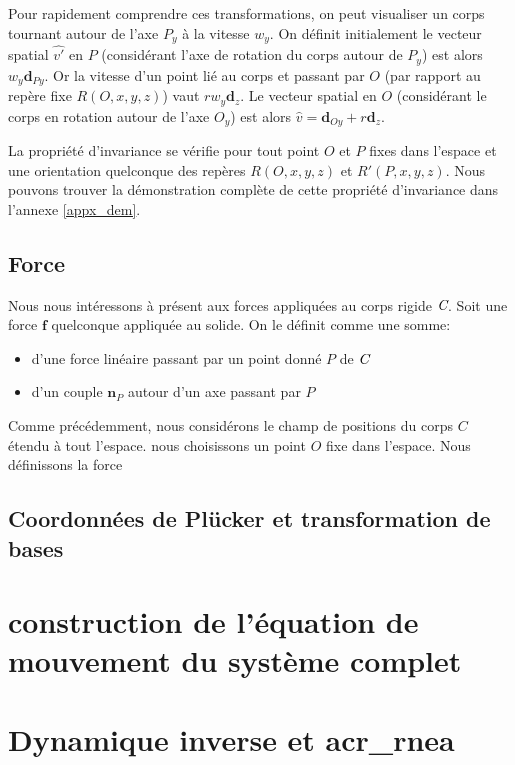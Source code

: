 \documentclass{report}
\begin{document}
Pour rapidement comprendre ces transformations, on peut visualiser un corps tournant autour de l'axe $P_{y}$ à la vitesse $w_{y}$. On définit initialement le vecteur spatial $\widehat{v'}$ en $P$ (\cad considérant l'axe de rotation du corps autour de $P_{y}$) est alors $w_{y}\textbf{d}_{Py}$. Or la vitesse d'un point lié au corps et passant par $O$ (par rapport au repère fixe $R(O,x,y,z)$) vaut $rw_{y}\textbf{d}_{z}$. Le vecteur spatial en $O$ (\cad considérant le corps en rotation autour de l'axe $O_{y}$) est alors $\widehat{v}=\textbf{d}_{Oy}+r\textbf{d}_{z}$.

La propriété d'invariance se vérifie pour tout point $O$ et $P$ fixes dans l'espace et une orientation quelconque des repères $R(O,x,y,z)$ et $R'(P,x,y,z)$. Nous pouvons trouver la démonstration complète de cette propriété d'invariance dans l'annexe \ref{appx_dem}.


\subsection{Force}

Nous nous intéressons à présent aux forces appliquées au corps rigide $\emph{C}$. Soit une force $\textbf{f}$ quelconque appliquée au solide. On le définit comme une somme:
\begin{itemize}
\item d'une force linéaire passant par un point donné $P$ de $\emph{C}$
\item d'un couple $\textbf{n}_{P}$ autour d'un axe passant par $P$
\end{itemize}

Comme précédemment, nous considérons le champ de positions du corps $C$ étendu à tout l'espace. nous choisissons un point $O$ fixe dans l'espace. Nous définissons la force 

\subsection{Coordonnées de Plücker et transformation de bases}


\section{construction de l'équation de mouvement du système complet}\label{ch_algSpa_equationMouvement}

\section{Dynamique inverse et \gls{acr_rnea}}
\end{document}
